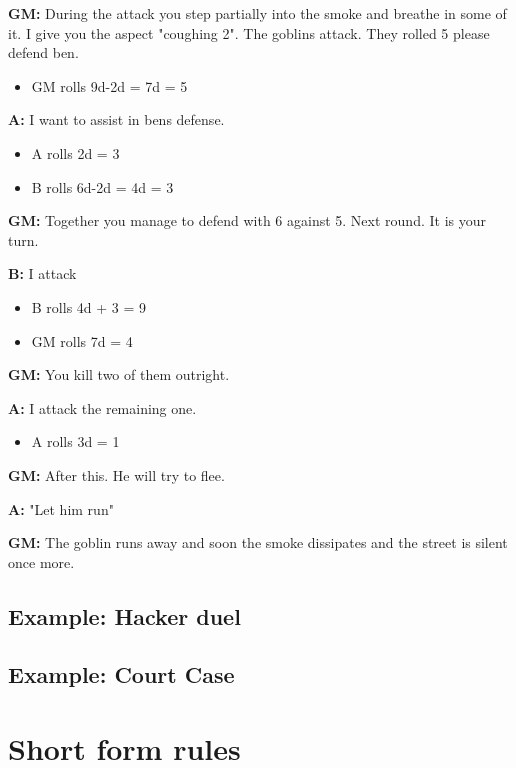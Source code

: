 \documentclass[11pt]{article}
\begin{document}
{\textbf{GM:} During the attack you step partially into the smoke and breathe in some of it. I give you the aspect "coughing 2". The goblins attack. They rolled 5 please defend ben.
\begin{itemize}
\item GM rolls 9d-2d = 7d = 5
\end{itemize}

\textbf{A:} I want to assist in bens defense.
\begin{itemize}
\item A rolls 2d = 3
\item B rolls 6d-2d = 4d = 3
\end{itemize}

\textbf{GM:} Together you manage to defend with 6 against 5. Next round. It is your turn.

\textbf{B:} I attack
\begin{itemize}
\item B rolls 4d + 3 = 9
\item GM rolls 7d = 4
\end{itemize}

\textbf{GM:} You kill two of them outright.

\textbf{A:} I attack the remaining one.
\begin{itemize}
\item A rolls 3d = 1
\end{itemize}

\textbf{GM:} After this. He will try to flee.

\textbf{A:} "Let him run"

\textbf{GM:} The goblin runs away and soon the smoke dissipates and the street is silent once more.



\subsection{Example: Hacker duel}
\label{sec:orgaaad00f}

\subsection{Example: Court Case}
\label{sec:orga4f10e6}



\newpage

\section{Short form rules}
\label{sec:org1032406}

}
\end{document}

